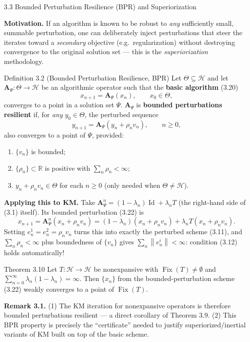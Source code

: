 \documentclass[aspectratio=169,10pt]{beamer}
\newcommand{\cH}{\mathcal{H}}
\newcommand{\Fix}{\operatorname{Fix}}
\newcommand{\R}{\mathbb{R}}
\newcommand{\norm}[1]{\left\|#1\right\|}
\begin{document}
\begin{frame}[allowframebreaks]{3.3 Bounded Perturbation Resilience (BPR) and Superiorization}

  \textbf{Motivation.} If an algorithm is known to be robust to
  \emph{any} sufficiently small, summable perturbation, one can
  deliberately inject perturbations that steer the iterates toward a
  \emph{secondary} objective (e.g.\ regularization) without destroying
  convergence to the original solution set --- this is the
  \emph{superiorization} methodology.

  \begin{block}{Definition 3.2 (Bounded Perturbation Resilience, BPR)}
    Let $\Theta\subseteq\cH$ and let $\mathbf A_\Psi:\Theta\to\cH$ be an
    algorithmic operator such that the \textbf{basic algorithm} (3.20)
    $$x_{n+1}=\mathbf A_\Psi(x_n), \qquad x_0\in\Theta,$$
    converges to a point in a solution set $\Psi$. $\mathbf A_\Psi$ is
    \textbf{bounded perturbations resilient} if, for \emph{any}
    $y_0\in\Theta$, the perturbed sequence
    $$y_{n+1}=\mathbf A_\Psi(y_n+\rho_n v_n), \qquad n\ge0,$$
    also converges to a point of $\Psi$, provided:
    \begin{enumerate}
      \item[(a)] $\{v_n\}$ is bounded;
      \item[(b)] $\{\rho_n\}\subset\R$ is positive with $\sum_n\rho_n<\infty$;
      \item[(c)] $y_n+\rho_n v_n\in\Theta$ for each $n\ge0$ (only needed
        when $\Theta\ne\cH$).
    \end{enumerate}
  \end{block}

  \framebreak

  \textbf{Applying this to KM.} Take $\mathbf A_\Psi^n=(1-\lambda_n)\operatorname{Id}+\lambda_n T$
  (the right-hand side of (3.1) itself). Its bounded perturbation
  (3.22) is
  $$x_{n+1}=\mathbf A^n_\Psi(x_n+\rho_n v_n)=(1-\lambda_n)(x_n+\rho_nv_n)+\lambda_nT(x_n+\rho_nv_n).$$
  Setting $e_n^1=e_n^2=\rho_nv_n$ turns this into exactly the perturbed
  scheme (3.11), and $\sum_n\rho_n<\infty$ plus boundedness of $\{v_n\}$
  gives $\sum_n\norm{e_n^i}<\infty$: condition (3.12) holds automatically!

  \begin{block}{Theorem 3.10}
    Let $T:\cH\to\cH$ be nonexpansive with $\Fix(T)\ne\emptyset$ and
    $\sum_{n=0}^{\infty}\lambda_n(1-\lambda_n)=\infty$. Then $\{x_n\}$
    from the bounded-perturbation scheme (3.22) weakly converges to a
    point of $\Fix(T)$.
  \end{block}

  \textbf{Remark 3.1.} (1) The KM iteration for nonexpansive operators
  is therefore bounded perturbations resilient --- a direct corollary of
  Theorem 3.9. (2) This BPR property is precisely the ``certificate''
  needed to justify superiorized/inertial variants of KM built on top
  of the basic scheme.
\end{frame}
\end{document}
